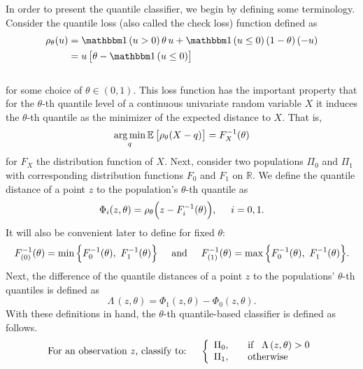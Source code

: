 In order to present the quantile classifier, we begin by defining some
terminology.  Consider the quantile loss (also called the check loss) function
defined as
\begin{align}
  \label{eq:check-loss}
  \begin{split}
    \rho_\theta(u)
    &= \ind(u > 0)\, \theta\, u  + \ind (u \leq 0)\, (1 - \theta)\, (-u)  \\[0ex]
    &= u\, \big[ \theta - \ind(u \leq 0) \big]
  \end{split}
\end{align}
\\[-1ex]
for some choice of $\theta \in (0,1)$.  This loss function has the important
property that for the $\theta$-th quantile level of a continuous univariate
random variable $X$ it induces the $\theta$-th quantile as the minimizer of the
expected distance to $X$.  That is,
\begin{equation}
  \label{eq:check-loss-min}
  \operatorname*{arg\,min}_q \mathbb{E}\, \big[ \rho_\theta (X - q) \big] = F_X^{-1}(\theta)
\end{equation}
for $F_X$ the distribution function of $X$.  Next, consider two populations
$\Pi_0$ and $\Pi_1$ with corresponding distribution functions $F_0$ and $F_1$ on
$\mathbb{R}$.  We define the quantile distance of a point $z$ to the
population's $\theta$-th quantile as
\begin{equation}
  \label{eq:phi}
  \Phi_i(z, \theta) = \rho_{\theta}\Big(z - F_i^{-1}(\theta)\Big),
  \hspace{5mm} i = 0, 1.
\end{equation}
It will also be convenient later to define for fixed $\theta$:
\begin{equation}
  \label{eq:F-order-stats}
  F_{(0)}^{-1}(\theta) = \min\Big\{ F_0^{-1}(\theta),~ F_1^{-1}(\theta) \Big\}
  \hspace{5mm} \text{and} \hspace{5mm}
  F_{(1)}^{-1}(\theta) = \max\Big\{ F_0^{-1}(\theta),~ F_1^{-1}(\theta) \Big\}.
\end{equation}
Next, the difference of the quantile distances of a point $z$ to the populations'
$\theta$-th quantiles is defined as
\begin{equation}
  \Lambda\,(z, \theta) = \Phi_1(z, \theta) - \Phi_0(z, \theta).
\end{equation}
With these definitions in hand, the $\theta$-th quantile-based classifier is
defined as follows.
\begin{equation}
  \label{eq:quantile-classifier}
  \text{For an observation $z$, classify to:} \hspace{5mm} \left\{ 
    \begin{array}{lcl}
      \Pi_0, & & \text{if} \hspace{3mm}\Lambda\,(z, \theta) > 0 \\[0ex]
      \Pi_1, & & \text{otherwise}
    \end{array}
  \right.
\end{equation}
